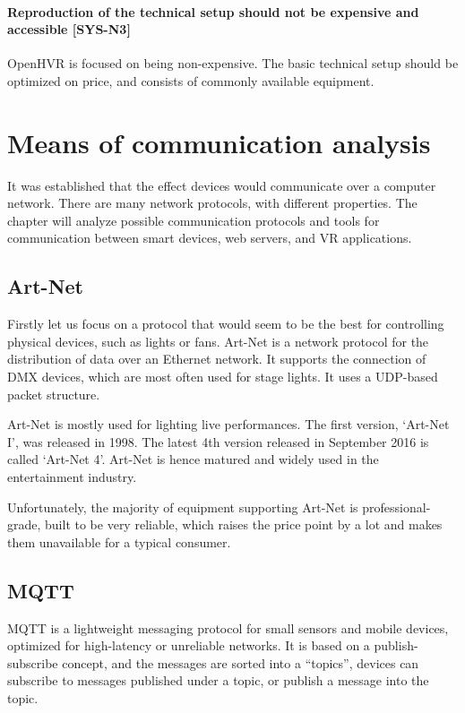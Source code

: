 \paragraph*{\textbf{Reproduction of the technical setup should not be expensive and accessible} [SYS-N3]}
OpenHVR is focused on being non-expensive. The basic technical setup should be
optimized on price, and consists of commonly available equipment.


\hypertarget{x-means-of-communication-analysis}{\section{Means of communication analysis}}
It was established that the effect devices would communicate over a computer network.
There are many network protocols, with different properties. The chapter will
analyze possible communication protocols and tools for communication
between smart devices, web servers, and VR applications.


\hypertarget{x-art-net}{\subsection{Art-Net}}
Firstly let us focus on a protocol that would seem to be the best for controlling
physical devices, such as lights or fans. Art-Net is a network protocol for
the distribution of data over an Ethernet network. It supports the connection of DMX
devices, which are most often used for stage lights. It uses a UDP-based packet
structure. \cite{artnet}


Art-Net is mostly used for lighting live performances. The first version,
`Art-Net I', was released in 1998. The latest 4th version released
in September 2016
is called `Art-Net 4'. Art-Net is hence matured and widely used in the
entertainment industry.


Unfortunately, the majority of equipment supporting Art-Net is
professional-grade, built to be very reliable, which raises the price point
by a lot and makes them unavailable for a typical consumer.


\hypertarget{x-mqtt}{\subsection{MQTT}}
MQTT is a lightweight messaging protocol for small sensors and mobile devices,
optimized for high-latency or unreliable networks.  It is
based on a publish-subscribe concept, and the messages are sorted into a ``topics'',
devices can subscribe to messages published under a topic, or publish
a message into the topic.\cite{mqtthp}


